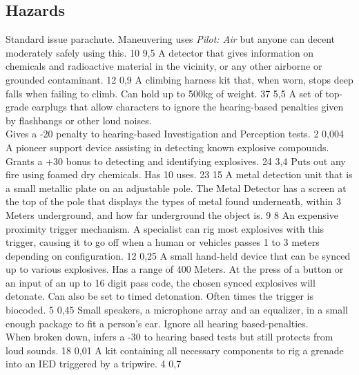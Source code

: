 \subsection{Hazards}
\vspace{10mm}
\begin{multicols}{2}
    {Standard issue parachute.
        Maneuvering uses \emph{Pilot: Air}
        but anyone can decent moderately safely using this.}
    {10}
    {9,5}
    {A detector that gives information on chemicals and radioactive material in the vicinity,
	or any other airborne or grounded contaminant.
	}{12}
    {0,9}
    {A climbing harness kit that, when worn, stops deep falls when failing to climb.
        Can hold up to 500kg of weight.}
    {37}
    {5,5}
    {A set of top-grade earplugs that allow characters
        to ignore the hearing-based penalties given by flashbangs or other loud noises.\\
        Gives a -20 penalty to hearing-based Investigation and Perception tests.}
    {2}
    {0,004}
    {A pioneer support device assisting in detecting known explosive compounds.
        Grants a +30 bonus to detecting and identifying explosives.}
    {24}
    {3,4}
    {Puts out any fire using foamed dry chemicals. Has 10 uses.}
    {23}
    {15}
    {A metal detection unit that is a small metallic plate on an adjustable pole.
        The Metal Detector has a screen at the top of the pole
        that displays the types of metal found underneath,
        within 3 Meters underground,
        and how far underground the object is.}
    {9}
    {8}
    {An expensive proximity trigger mechanism.
        A specialist can rig most explosives with this trigger,
        causing it to go off when a human or vehicles passes
        1 to 3 meters depending on configuration.}
    {12}
    {0,25}
    {A small hand-held device that can be synced up to various explosives.
        Has a range of 400 Meters.
        At the press of a button or an input of an up to 16 digit pass code,
        the chosen synced explosives will detonate.
        Can also be set to timed detonation.
        Often times the trigger is biocoded.}
    {5}
    {0,45}
    {Small speakers, a microphone array and an equalizer,
        in a small enough package to fit a person's ear.
        Ignore all hearing based-penalties.\\
        When broken down, infers a -30 to hearing based tests
        but still protects from loud sounds.}
    {18}
    {0,01}
    {A kit containing all necessary components to rig a grenade
        into an IED triggered by a tripwire.}
    {4}
    {0,7}
\end{multicols}

